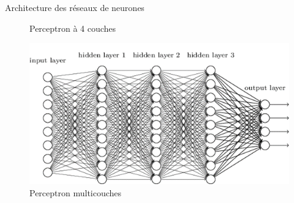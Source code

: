 \documentclass{beamer}
\begin{document}
\begin{frame}{Architecture des réseaux de neurones }
\begin{figure}[h]
\begin{minipage}{0.5\textwidth}
			\caption{Perceptron à 4 couches}
		\end{minipage}\hfill
		\begin{minipage}{0.5\textwidth}
			\centering
			\includegraphics[width=\linewidth]{Architecture-perceptron-multi-couches-1.png}
			\caption{Perceptron multicouches}
		\end{minipage}
	\end{figure}
\end{frame}	
\end{document}
